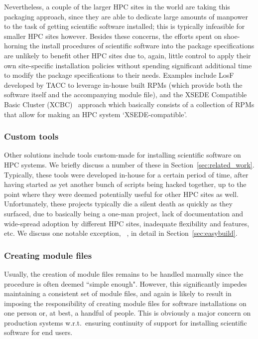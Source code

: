 Nevertheless, a couple of the larger HPC sites in the world are taking this
packaging approach, since they are able to dedicate large amounts of manpower to
the task of getting scientific software installed; this is typically infeasible for
smaller HPC sites however. Besides these concerns, the efforts spent on
shoe-horning the install procedures of scientific software into the package
specifications are unlikely to
benefit other HPC sites due to, again, little control to apply their own
site-specific installation policies without spending significant additional time to
modify the package specifications to their needs. Examples include
LosF~\cite{lmodSC11} developed
by TACC to leverage in-house built RPMs (which provide both the software itself
and the accompanying module file), and the XSEDE Compatible Basic Cluster
(XCBC)~\cite{Fischer14} approach which basically consists of a collection of RPMs that
allow for making an HPC system `XSEDE-compatible'.

\subsubsection{Custom tools}

Other solutions include tools custom-made for installing scientific software
on HPC systems. We briefly discuss a number of these in
Section~\ref{sec:related_work}. Typically, these tools were developed in-house for
a certain period of time, after having started as yet another bunch of
scripts being hacked together, up to the point where they were deemed potentially
useful for other HPC sites as well. Unfortunately, these projects typically die a
silent death as quickly as they surfaced, due to basically being a one-man project,
lack of documentation and wide-spread adoption by different HPC sites, inadequate
flexibility and features, etc. We discuss one notable
exception, \easybuild{}~\cite{EasyBuildSC12}, in detail in
Section~\ref{sec:easybuild}.

\subsubsection{Creating module files}

Usually, the creation of module files remains to be handled manually since the
procedure is often deemed ``simple enough". However, this significantly impedes
maintaining a consistent set of module files, and again is likely to result in
imposing the responsibility of creating module files for software installations
on one person or, at best, a handful of people. This is obviously a major concern
on production systems w.r.t.\ ensuring continuity of support for installing
scientific software for end users.

